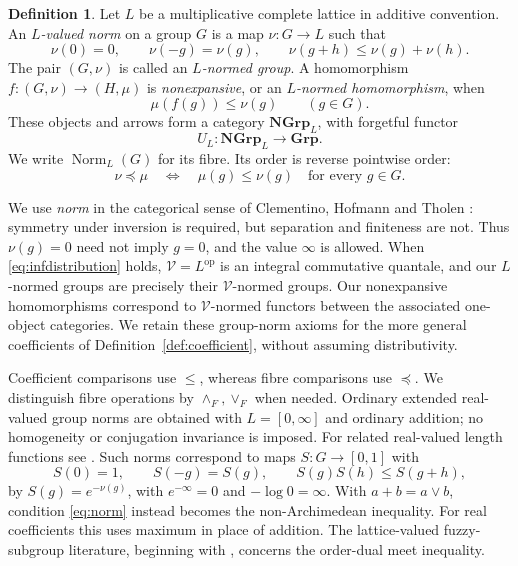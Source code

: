 \documentclass[12pt,a4paper]{amsart}
\theoremstyle{definition}
\newtheorem{definition}[theorem]{Definition}
\newcommand{\Grp}{\mathbf{Grp}}
\newcommand{\op}{\mathrm{op}}
\newcommand{\Norm}{\operatorname{Norm}}
\newcommand{\NGrp}{\mathbf{NGrp}}
\begin{document}
\begin{definition}\label{def:norm}
Let $L$ be a multiplicative complete lattice in additive convention. An \emph{$L$-valued norm} on a group $G$ is a map $\nu:G\to L$ such that
\begin{equation}\label{eq:norm}
 \nu(0)=0,\qquad \nu(-g)=\nu(g),\qquad
 \nu(g+h)\leq\nu(g)+\nu(h).
\end{equation}
The pair $(G,\nu)$ is called an \emph{$L$-normed group}.
A homomorphism $f:(G,\nu)\to(H,\mu)$ is \emph{nonexpansive}, or an \emph{$L$-normed homomorphism}, when
\begin{equation}\label{eq:nonexpansive}
                         \mu(f(g))\leq\nu(g)\qquad(g\in G).
\end{equation}
These objects and arrows form a category $\NGrp_L$, with forgetful functor
\[
                         U_L:\NGrp_L\longrightarrow\Grp.
\]
We write $\Norm_L(G)$ for its fibre. Its order is reverse pointwise order:
\begin{equation}\label{eq:reverse}
           \nu\preceq \mu\quad\Longleftrightarrow\quad
           \mu(g)\leq\nu(g)\quad\text{for every }g\in G.
\end{equation}
\end{definition}

We use \emph{norm} in the categorical sense of Clementino, Hofmann and Tholen \cite[\S5]{CHT}: symmetry under inversion is required, but separation and finiteness are not. Thus $\nu(g)=0$ need not imply $g=0$, and the value $\infty$ is allowed. When \eqref{eq:infdistribution} holds, $\mathcal V=L^{\op}$ is an integral commutative quantale, and our $L$-normed groups are precisely their $\mathcal V$-normed groups. Our nonexpansive homomorphisms correspond to $\mathcal V$-normed functors between the associated one-object categories. We retain these group-norm axioms for the more general coefficients of Definition~\ref{def:coefficient}, without assuming distributivity.

Coefficient comparisons use $\leq$, whereas fibre comparisons use $\preceq$.
We distinguish fibre operations by $\wedge_F,\vee_F$ when needed.
Ordinary extended real-valued group norms are obtained with $L=[0,\infty]$ and ordinary addition; no homogeneity or conjugation invariance is imposed. For related real-valued length functions see \cite{Polymath}. Such norms correspond to maps $S:G\to[0,1]$ with
\[
 S(0)=1,\qquad S(-g)=S(g),\qquad S(g)S(h)\leq S(g+h),
\]
by $S(g)=e^{-\nu(g)}$, with $e^{-\infty}=0$ and $-\log0=\infty$.
With $a+b=a\vee b$, condition \eqref{eq:norm} instead becomes the non-Archimedean inequality. For real coefficients this uses maximum in place of addition. The lattice-valued fuzzy-subgroup literature, beginning with \cite{Goguen,Rosenfeld}, concerns the order-dual meet inequality.
\end{document}
